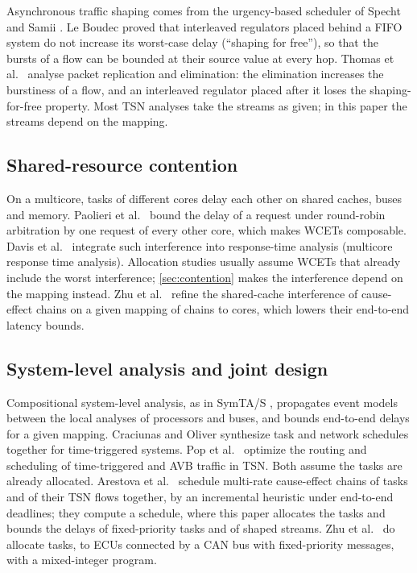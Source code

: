Asynchronous traffic shaping comes from the urgency-based scheduler of
Specht and Samii \cite{specht2016urgency}. Le Boudec
\cite{leboudec2018theory} proved that interleaved regulators placed
behind a FIFO system do not increase its worst-case delay (``shaping for
free''), so that the bursts of a flow can be bounded at their source value
at every hop. Thomas et al.\ \cite{thomas2022worst} analyse packet
replication and elimination: the elimination increases the burstiness of
a flow, and an interleaved regulator placed after it loses the
shaping-for-free property. Most TSN analyses take the streams as given; in
this paper the streams depend on the mapping.

\subsection{Shared-resource contention}

On a multicore, tasks of different cores delay each other on shared
caches, buses and memory. Paolieri et al.\ \cite{paolieri2009hardware}
bound the delay of a request under round-robin arbitration by one request
of every other core, which makes WCETs composable. Davis et al.\
\cite{davis2018extensible} integrate such interference into
response-time analysis (multicore response time analysis). Allocation
studies usually assume WCETs that already include the worst
interference; \cref{sec:contention} makes the interference depend on the
mapping instead. Zhu et al.\ \cite{zhu2026reducing} refine the shared-cache
interference of cause-effect chains on a given mapping of chains to
cores, which lowers their end-to-end latency bounds.

\subsection{System-level analysis and joint design}

Compositional system-level analysis, as in SymTA/S
\cite{henia2005system}, propagates event models between the local
analyses of processors and buses, and bounds end-to-end delays for a
given mapping. Craciunas and Oliver \cite{craciunas2016combined}
synthesize task and network schedules together for time-triggered
systems. Pop et al.\ \cite{pop2016design} optimize the routing and
scheduling of time-triggered and AVB traffic in TSN. Both assume the tasks
are already allocated. Arestova et al.\ \cite{arestova2022itans} schedule
multi-rate cause-effect chains of tasks and of their TSN flows together,
by an incremental heuristic under end-to-end deadlines; they compute a
schedule, where this paper allocates the tasks and bounds the delays of
fixed-priority tasks and of shaped streams. Zhu et al.\ \cite{zhu2012optimization} do allocate tasks, to ECUs connected
by a CAN bus with fixed-priority messages, with a mixed-integer program.

